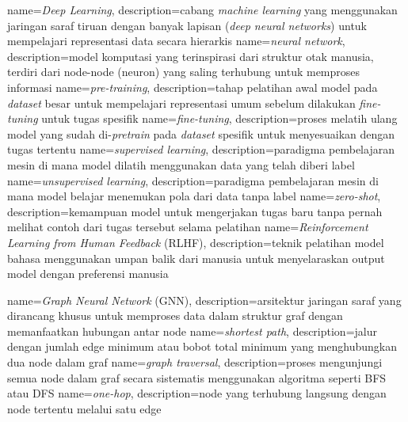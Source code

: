 {
	name={\textit{Deep Learning}},
	description={cabang \textit{machine learning} yang menggunakan jaringan saraf tiruan dengan banyak lapisan (\textit{deep neural networks}) untuk mempelajari representasi data secara hierarkis}
}
{
	name={\textit{neural network}},
	description={model komputasi yang terinspirasi dari struktur otak manusia, terdiri dari node-node (neuron) yang saling terhubung untuk memproses informasi}
}
{
	name={\textit{pre-training}},
	description={tahap pelatihan awal model pada \textit{dataset} besar untuk mempelajari representasi umum sebelum dilakukan \textit{fine-tuning} untuk tugas spesifik}
}
{
	name={\textit{fine-tuning}},
	description={proses melatih ulang model yang sudah di-\textit{pretrain} pada \textit{dataset} spesifik untuk menyesuaikan dengan tugas tertentu}
}
{
	name={\textit{supervised learning}},
	description={paradigma pembelajaran mesin di mana model dilatih menggunakan data yang telah diberi label}
}
{
	name={\textit{unsupervised learning}},
	description={paradigma pembelajaran mesin di mana model belajar menemukan pola dari data tanpa label}
}
{
	name={\textit{zero-shot}},
	description={kemampuan model untuk mengerjakan tugas baru tanpa pernah melihat contoh dari tugas tersebut selama pelatihan}
}
{
	name={\textit{Reinforcement Learning from Human Feedback} (RLHF)},
	description={teknik pelatihan model bahasa menggunakan umpan balik dari manusia untuk menyelaraskan output model dengan preferensi manusia}
}

{
	name={\textit{Graph Neural Network} (GNN)},
	description={arsitektur jaringan saraf yang dirancang khusus untuk memproses data dalam struktur graf dengan memanfaatkan hubungan antar node}
}
{
	name={\textit{shortest path}},
	description={jalur dengan jumlah edge minimum atau bobot total minimum yang menghubungkan dua node dalam graf}
}
{
	name={\textit{graph traversal}},
	description={proses mengunjungi semua node dalam graf secara sistematis menggunakan algoritma seperti BFS atau DFS}
}
{
	name={\textit{one-hop}},
	description={node yang terhubung langsung dengan node tertentu melalui satu edge}
}

